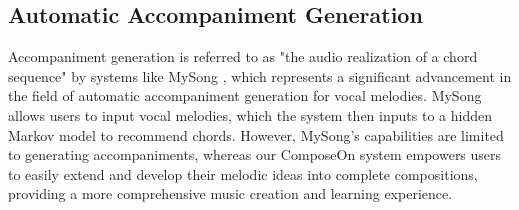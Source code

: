 \subsection{Automatic Accompaniment Generation}
Accompaniment generation is referred to as "the audio realization of a chord sequence"
by systems like MySong \cite{simon2008mysong}, which represents a significant advancement in the field of automatic accompaniment generation for vocal melodies. MySong allows users to input vocal melodies, which the system then inputs to a hidden Markov model to recommend chords. However, MySong's capabilities are limited to generating accompaniments, whereas our ComposeOn system empowers users to easily extend and develop their melodic ideas into complete compositions, providing a more comprehensive music creation and learning experience.

